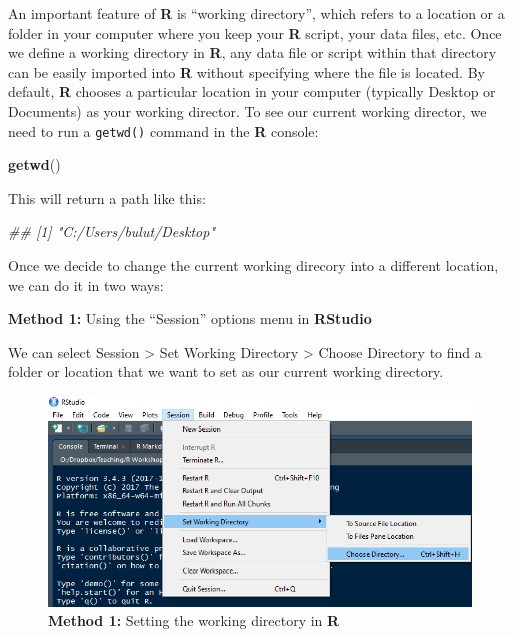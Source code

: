 \documentclass[]{book}
\newenvironment{Shaded}{\begin{snugshade}}{\end{snugshade}}
\newcommand{\CommentTok}[1]{\textcolor[rgb]{0.56,0.35,0.01}{\textit{#1}}}
\newcommand{\KeywordTok}[1]{\textcolor[rgb]{0.13,0.29,0.53}{\textbf{#1}}}
\newcommand{\NormalTok}[1]{#1}
\begin{document}
An important feature of \textbf{R} is ``working directory'', which refers to a location or a folder in your computer where you keep your \textbf{R} script, your data files, etc. Once we define a working directory in \textbf{R}, any data file or script within that directory can be easily imported into \textbf{R} without specifying where the file is located. By default, \textbf{R} chooses a particular location in your computer (typically Desktop or Documents) as your working director. To see our current working director, we need to run a \texttt{getwd()} command in the \textbf{R} console:

\begin{Shaded}
\begin{Highlighting}[]
\KeywordTok{getwd}\NormalTok{()}
\end{Highlighting}
\end{Shaded}

This will return a path like this:

\begin{Shaded}
\begin{Highlighting}[]
\CommentTok{## [1] "C:/Users/bulut/Desktop"}
\end{Highlighting}
\end{Shaded}

Once we decide to change the current working direcory into a different location, we can do it in two ways:

\textbf{Method 1:} Using the ``Session'' options menu in \textbf{RStudio}

We can select Session \textgreater{} Set Working Directory \textgreater{} Choose Directory to find a folder or location that we want to set as our current working directory.

\begin{figure}
\centering
\includegraphics{figure/img6.png}
\caption{\textbf{Method 1:} Setting the working directory in \textbf{R}}
\end{figure}
\end{document}

